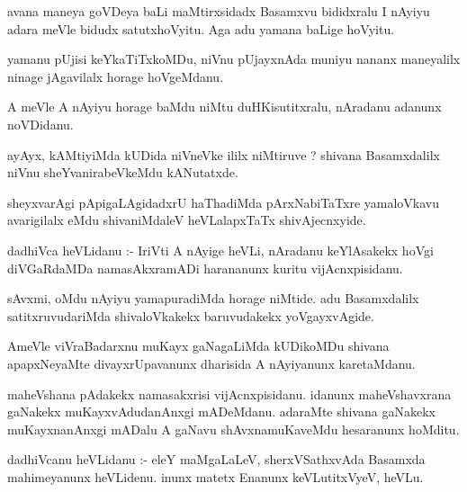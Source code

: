 \documentclass{article}
\begin{document}
\begin{mn}
avana  maneya  goVDeya  baLi  maMtirxsidadx  Basamxvu  bididxralu  I  nAyiyu  adara  meVle  bidudx  
satutxhoVyitu.  Aga  adu  yamana  baLige  hoVyitu.
\end{mn}

\begin{mn}
yamanu  pUjisi  keYkaTiTxkoMDu,  niVnu  pUjayxnAda  muniyu  nananx  maneyalilx  ninage  jAgavilalx  horage  hoVgeMdanu.
\end{mn}

\begin{mn}
A  meVle  A  nAyiyu  horage  baMdu  niMtu  duHKisutitxralu,  nAradanu  adanunx  noVDidanu.
\end{mn}

\begin{mn}
ayAyx,  kAMtiyiMda  kUDida  niVneVke  ililx  niMtiruve ?  shivana Basamxdalilx  niVnu  sheYvanirabeVkeMdu  kANutatxde.
\end{mn}

\begin{mn}
sheyxvarAgi  pApigaLAgidadxrU  haThadiMda  pArxNabiTaTxre  yamaloVkavu  avarigilalx  eMdu  shivaniMdaleV  
heVLalapxTaTx  shivAjecnxyide.
\end{mn}

\begin{mn}
dadhiVca  heVLidanu :- IriVti  A  nAyige  heVLi,  nAradanu  keYlAsakekx  hoVgi  diVGaRdaMDa  namasAkxramADi  
harananunx  kuritu  vijAcnxpisidanu.
\end{mn}

\begin{mn}
sAvxmi,  oMdu  nAyiyu  yamapuradiMda  horage  niMtide.  adu  Basamxdalilx  satitxruvudariMda  shivaloVkakekx  
baruvudakekx  yoVgayxvAgide.
\end{mn}

\begin{mn}
AmeVle  viVraBadarxnu  muKayx  gaNagaLiMda  kUDikoMDu  shivana  apapxNeyaMte  divayxrUpavanunx  dharisida  
A  nAyiyanunx  karetaMdanu.
\end{mn}

\begin{mn}
maheVshana  pAdakekx  namasakxrisi  vijAcnxpisidanu.  idanunx  maheVshavxrana  gaNakekx  muKayxvAdudanAnxgi  
mADeMdanu.  adaraMte  shivana gaNakekx  muKayxnanAnxgi  mADalu  A  gaNavu  shAvxnamuKaveMdu  hesaranunx  hoMditu.
\end{mn}

\begin{mn}
dadhiVcanu  heVLidanu :- eleY  maMgaLaLeV,  sherxVSathxvAda  Basamxda  mahimeyanunx  heVLidenu.  inunx  matetx  
Enanunx  keVLutitxVyeV,  heVLu.
\end{mn}
\end{document}
